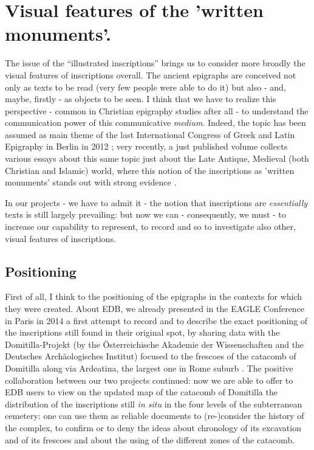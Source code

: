 \documentclass[amsthm,ebook]{saparticle}
\begin{document}
\section{Visual features of the 'written monuments'.}


\noindent The issue of the ``illustrated inscriptions'' brings us to consider more broadly the visual
features of inscriptions overall. The ancient epigraphs are conceived not only as texts to be read (very few people
were able to do it) but also - and, maybe, firstly - as objects to be seen. I think that we have to realize this
perspective - common in Christian epigraphy studies after all - to understand the communication power of this
communicative \emph{medium}. Indeed, the topic has been assumed as main theme of the last International Congress of Greek and
Latin Epigraphy in Berlin in 2012 \citep{eck_vol_2014}; very recently, a just published volume collects various essays
about this same topic just about the Late Antique, Medieval (both Christian and Islamic) world, where this notion of
the inscriptions as 'written monuments' stands out with strong evidence \citep[see][]{eastmond_viewing_2015}. 

In our projects - we have to admit it - the notion that inscriptions are \emph{essentially} texts is still largely
prevailing: but now we can - consequently, we must - to increase our capability to represent, to record and so to
investigate also other, visual features of inscriptions. 




\subsection{Positioning}


\noindent First of all, I think to the positioning of the epigraphs in the contexts for which they were created. About EDB, we
already presented in the EAGLE Conference in Paris in 2014 a first attempt to record and to describe the exact
positioning of the inscriptions still found in their original spot, by sharing data with the Domitilla-Projekt (by the
Österreichische Akademie der Wissenschaften and the Deutsches Archäologisches Institut) focused to the frescoes of the
catacomb of Domitilla along via Ardeatina, the largest one in Rome suburb \citep{zimmermann_epigraphy_2014}. The positive
collaboration between our two projects continued: now we are able to offer to EDB users to view on the updated map of
the catacomb of Domitilla the distribution of the inscriptions still \emph{in situ} in the four levels of the subterranean
cemetery: one can use them as reliable documents to (re-)consider the history of the complex, to confirm or to deny the
ideas about chronology of its excavation and of its frescoes and about the using of the different zones of the
catacomb.
\end{document}
